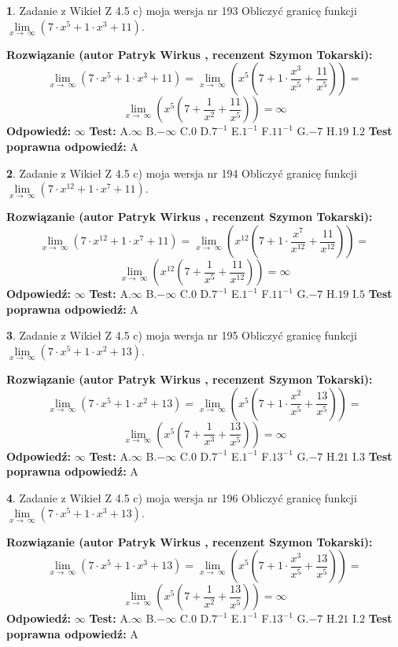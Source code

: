 \documentclass[12pt, a4paper]{article}
\theoremstyle{definition} %
\newtheorem{zad}{}
\newcommand{\zadStart}[1]{\begin{zad}#1\newline}
\newcommand{\zadStop}{\end{zad}}
\newcommand{\rozwStart}[2]{\noindent \textbf{Rozwiązanie (autor #1 , recenzent #2): }\newline}
\newcommand{\rozwStop}{\newline}
\newcommand{\odpStart}{\noindent \textbf{Odpowiedź:}\newline}
\newcommand{\odpStop}{\newline}
\newcommand{\testStart}{\noindent \textbf{Test:}\newline}
\newcommand{\testStop}{\newline}
\newcommand{\kluczStart}{\noindent \textbf{Test poprawna odpowiedź:}\newline}
\newcommand{\kluczStop}{\newline}
\begin{document}
\zadStart{Zadanie z Wikieł Z 4.5 c) moja wersja nr 193}
Obliczyć granicę funkcji  $\lim\limits_{x\to\ \infty}(7 \cdot x^{5}+1 \cdot x^{3}+11)$.
\zadStop
\rozwStart{Patryk Wirkus}{Szymon Tokarski}
$$\lim\limits_{x\to\ \infty}(7 \cdot x^{5}+1 \cdot x^{3}+11) = \lim\limits_{x\to\ \infty}(x^{5}(7 +1 \cdot \frac{x^{3}}{x^{5}}+\frac{11}{x^{5}})) =$$ $$\lim\limits_{x\to\ \infty}(x^{5}(7 +\frac{1}{x^{2}}+\frac{11}{x^{5}})) =\infty$$
\rozwStop
\odpStart
$\infty$
\odpStop
\testStart
A.$\infty$ B.$-\infty$ C.$0$ D.$7^{-1}$ E.$1^{-1}$
F.$11^{-1}$ G.$-7$
H.$19$
I.$2$
\testStop
\kluczStart
A
\kluczStop



\zadStart{Zadanie z Wikieł Z 4.5 c) moja wersja nr 194}
Obliczyć granicę funkcji  $\lim\limits_{x\to\ \infty}(7 \cdot x^{12}+1 \cdot x^{7}+11)$.
\zadStop
\rozwStart{Patryk Wirkus}{Szymon Tokarski}
$$\lim\limits_{x\to\ \infty}(7 \cdot x^{12}+1 \cdot x^{7}+11) = \lim\limits_{x\to\ \infty}(x^{12}(7 +1 \cdot \frac{x^{7}}{x^{12}}+\frac{11}{x^{12}})) =$$ $$\lim\limits_{x\to\ \infty}(x^{12}(7 +\frac{1}{x^{5}}+\frac{11}{x^{12}})) =\infty$$
\rozwStop
\odpStart
$\infty$
\odpStop
\testStart
A.$\infty$ B.$-\infty$ C.$0$ D.$7^{-1}$ E.$1^{-1}$
F.$11^{-1}$ G.$-7$
H.$19$
I.$5$
\testStop
\kluczStart
A
\kluczStop



\zadStart{Zadanie z Wikieł Z 4.5 c) moja wersja nr 195}
Obliczyć granicę funkcji  $\lim\limits_{x\to\ \infty}(7 \cdot x^{5}+1 \cdot x^{2}+13)$.
\zadStop
\rozwStart{Patryk Wirkus}{Szymon Tokarski}
$$\lim\limits_{x\to\ \infty}(7 \cdot x^{5}+1 \cdot x^{2}+13) = \lim\limits_{x\to\ \infty}(x^{5}(7 +1 \cdot \frac{x^{2}}{x^{5}}+\frac{13}{x^{5}})) =$$ $$\lim\limits_{x\to\ \infty}(x^{5}(7 +\frac{1}{x^{3}}+\frac{13}{x^{5}})) =\infty$$
\rozwStop
\odpStart
$\infty$
\odpStop
\testStart
A.$\infty$ B.$-\infty$ C.$0$ D.$7^{-1}$ E.$1^{-1}$
F.$13^{-1}$ G.$-7$
H.$21$
I.$3$
\testStop
\kluczStart
A
\kluczStop



\zadStart{Zadanie z Wikieł Z 4.5 c) moja wersja nr 196}
Obliczyć granicę funkcji  $\lim\limits_{x\to\ \infty}(7 \cdot x^{5}+1 \cdot x^{3}+13)$.
\zadStop
\rozwStart{Patryk Wirkus}{Szymon Tokarski}
$$\lim\limits_{x\to\ \infty}(7 \cdot x^{5}+1 \cdot x^{3}+13) = \lim\limits_{x\to\ \infty}(x^{5}(7 +1 \cdot \frac{x^{3}}{x^{5}}+\frac{13}{x^{5}})) =$$ $$\lim\limits_{x\to\ \infty}(x^{5}(7 +\frac{1}{x^{2}}+\frac{13}{x^{5}})) =\infty$$
\rozwStop
\odpStart
$\infty$
\odpStop
\testStart
A.$\infty$ B.$-\infty$ C.$0$ D.$7^{-1}$ E.$1^{-1}$
F.$13^{-1}$ G.$-7$
H.$21$
I.$2$
\testStop
\kluczStart
A
\kluczStop
\end{document}
